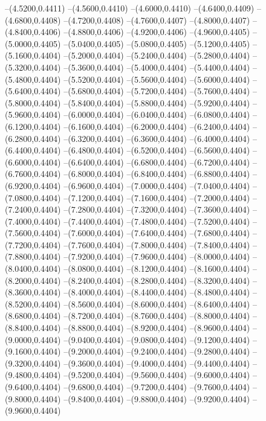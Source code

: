 {	--(4.5200,0.4411)
	--(4.5600,0.4410)
	--(4.6000,0.4410)
	--(4.6400,0.4409)
	--(4.6800,0.4408)
	--(4.7200,0.4408)
	--(4.7600,0.4407)
	--(4.8000,0.4407)
	--(4.8400,0.4406)
	--(4.8800,0.4406)
	--(4.9200,0.4406)
	--(4.9600,0.4405)
	--(5.0000,0.4405)
	--(5.0400,0.4405)
	--(5.0800,0.4405)
	--(5.1200,0.4405)
	--(5.1600,0.4404)
	--(5.2000,0.4404)
	--(5.2400,0.4404)
	--(5.2800,0.4404)
	--(5.3200,0.4404)
	--(5.3600,0.4404)
	--(5.4000,0.4404)
	--(5.4400,0.4404)
	--(5.4800,0.4404)
	--(5.5200,0.4404)
	--(5.5600,0.4404)
	--(5.6000,0.4404)
	--(5.6400,0.4404)
	--(5.6800,0.4404)
	--(5.7200,0.4404)
	--(5.7600,0.4404)
	--(5.8000,0.4404)
	--(5.8400,0.4404)
	--(5.8800,0.4404)
	--(5.9200,0.4404)
	--(5.9600,0.4404)
	--(6.0000,0.4404)
	--(6.0400,0.4404)
	--(6.0800,0.4404)
	--(6.1200,0.4404)
	--(6.1600,0.4404)
	--(6.2000,0.4404)
	--(6.2400,0.4404)
	--(6.2800,0.4404)
	--(6.3200,0.4404)
	--(6.3600,0.4404)
	--(6.4000,0.4404)
	--(6.4400,0.4404)
	--(6.4800,0.4404)
	--(6.5200,0.4404)
	--(6.5600,0.4404)
	--(6.6000,0.4404)
	--(6.6400,0.4404)
	--(6.6800,0.4404)
	--(6.7200,0.4404)
	--(6.7600,0.4404)
	--(6.8000,0.4404)
	--(6.8400,0.4404)
	--(6.8800,0.4404)
	--(6.9200,0.4404)
	--(6.9600,0.4404)
	--(7.0000,0.4404)
	--(7.0400,0.4404)
	--(7.0800,0.4404)
	--(7.1200,0.4404)
	--(7.1600,0.4404)
	--(7.2000,0.4404)
	--(7.2400,0.4404)
	--(7.2800,0.4404)
	--(7.3200,0.4404)
	--(7.3600,0.4404)
	--(7.4000,0.4404)
	--(7.4400,0.4404)
	--(7.4800,0.4404)
	--(7.5200,0.4404)
	--(7.5600,0.4404)
	--(7.6000,0.4404)
	--(7.6400,0.4404)
	--(7.6800,0.4404)
	--(7.7200,0.4404)
	--(7.7600,0.4404)
	--(7.8000,0.4404)
	--(7.8400,0.4404)
	--(7.8800,0.4404)
	--(7.9200,0.4404)
	--(7.9600,0.4404)
	--(8.0000,0.4404)
	--(8.0400,0.4404)
	--(8.0800,0.4404)
	--(8.1200,0.4404)
	--(8.1600,0.4404)
	--(8.2000,0.4404)
	--(8.2400,0.4404)
	--(8.2800,0.4404)
	--(8.3200,0.4404)
	--(8.3600,0.4404)
	--(8.4000,0.4404)
	--(8.4400,0.4404)
	--(8.4800,0.4404)
	--(8.5200,0.4404)
	--(8.5600,0.4404)
	--(8.6000,0.4404)
	--(8.6400,0.4404)
	--(8.6800,0.4404)
	--(8.7200,0.4404)
	--(8.7600,0.4404)
	--(8.8000,0.4404)
	--(8.8400,0.4404)
	--(8.8800,0.4404)
	--(8.9200,0.4404)
	--(8.9600,0.4404)
	--(9.0000,0.4404)
	--(9.0400,0.4404)
	--(9.0800,0.4404)
	--(9.1200,0.4404)
	--(9.1600,0.4404)
	--(9.2000,0.4404)
	--(9.2400,0.4404)
	--(9.2800,0.4404)
	--(9.3200,0.4404)
	--(9.3600,0.4404)
	--(9.4000,0.4404)
	--(9.4400,0.4404)
	--(9.4800,0.4404)
	--(9.5200,0.4404)
	--(9.5600,0.4404)
	--(9.6000,0.4404)
	--(9.6400,0.4404)
	--(9.6800,0.4404)
	--(9.7200,0.4404)
	--(9.7600,0.4404)
	--(9.8000,0.4404)
	--(9.8400,0.4404)
	--(9.8800,0.4404)
	--(9.9200,0.4404)
	--(9.9600,0.4404)
}
